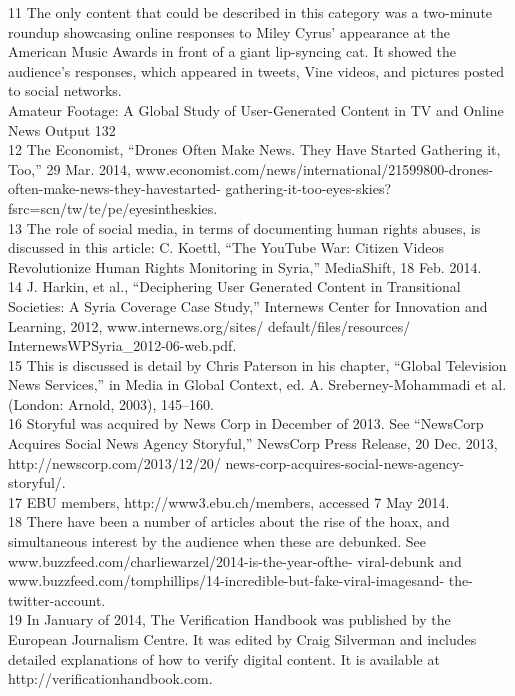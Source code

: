 \begin{enumerate}
11 The only content that could be described in this category was a two-minute roundup showcasing
online responses to Miley Cyrus' appearance at the American Music Awards in front of a giant
lip-syncing cat. It showed the audience's responses, which appeared in tweets, Vine videos, and
pictures posted to social networks.\\
Amateur Footage: A Global Study of User-Generated Content in TV and Online News Output
132\\
12 The Economist, ``Drones Often Make News. They Have Started Gathering it, Too,'' 29 Mar. 2014,
www.economist.com/news/international/21599800-drones-often-make-news-they-havestarted-
gathering-it-too-eyes-skies?fsrc=scn/tw/te/pe/eyesintheskies.\\
13 The role of social media, in terms of documenting human rights abuses, is discussed in this article:
C. Koettl, ``The YouTube War: Citizen Videos Revolutionize Human Rights Monitoring in Syria,''
MediaShift, 18 Feb. 2014.\\
14 J. Harkin, et al., ``Deciphering User Generated Content in Transitional Societies: A Syria Coverage
Case Study,'' Internews Center for Innovation and Learning, 2012, www.internews.org/sites/
default/files/resources/ InternewsWPSyria_2012-06-web.pdf.\\
15 This is discussed is detail by Chris Paterson in his chapter, ``Global Television News Services,'' in
Media in Global Context, ed. A. Sreberney-Mohammadi et al. (London: Arnold, 2003), 145–160.\\
16 Storyful was acquired by News Corp in December of 2013. See ``NewsCorp Acquires Social News
Agency Storyful,'' NewsCorp Press Release, 20 Dec. 2013, http://newscorp.com/2013/12/20/
news-corp-acquires-social-news-agency-storyful/.\\
17 EBU members, http://www3.ebu.ch/members, accessed 7 May 2014.\\
18 There have been a number of articles about the rise of the hoax, and simultaneous interest by the
audience when these are debunked. See www.buzzfeed.com/charliewarzel/2014-is-the-year-ofthe-
viral-debunk and www.buzzfeed.com/tomphillips/14-incredible-but-fake-viral-imagesand-
the-twitter-account.\\
19 In January of 2014, The Verification Handbook was published by the European Journalism Centre. It
was edited by Craig Silverman and includes detailed explanations of how to verify digital content. It
is available at http://verificationhandbook.com.\\

\end{enumerate}
